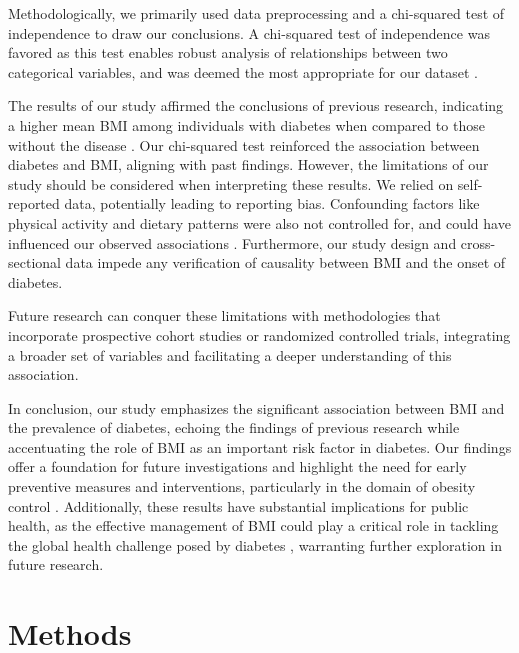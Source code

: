 \documentclass[11pt]{article}
\begin{document}
Methodologically, we primarily used data preprocessing and a chi-squared test of independence to draw our conclusions. A chi-squared test of independence was favored as this test enables robust analysis of relationships between two categorical variables, and was deemed the most appropriate for our dataset \cite{Mongraw-Chaffin2015TheSA}. 

The results of our study affirmed the conclusions of previous research, indicating a higher mean BMI among individuals with diabetes when compared to those without the disease \cite{rnlv2010ImpactOB, Rho2014IndependentIO, Read2021BMIAR}. Our chi-squared test reinforced the association between diabetes and BMI, aligning with past findings. However, the limitations of our study should be considered when interpreting these results. We relied on self-reported data, potentially leading to reporting bias. Confounding factors like physical activity and dietary patterns were also not controlled for, and could have influenced our observed associations \cite{Uloko2018PrevalenceAR}. Furthermore, our study design and cross-sectional data impede any verification of causality between BMI and the onset of diabetes.

Future research can conquer these limitations with methodologies that incorporate prospective cohort studies or randomized controlled trials, integrating a broader set of variables and facilitating a deeper understanding of this association. 

In conclusion, our study emphasizes the significant association between BMI and the prevalence of diabetes, echoing the findings of previous research while accentuating the role of BMI as an important risk factor in diabetes. Our findings offer a foundation for future investigations and highlight the need for early preventive measures and interventions, particularly in the domain of obesity control \cite{Zhu2019RacialEthnicDI}. Additionally, these results have substantial implications for public health, as the effective management of BMI could play a critical role in tackling the global health challenge posed by diabetes \cite{Uloko2018PrevalenceAR}, warranting further exploration in future research.

\section*{Methods}
\end{document}
